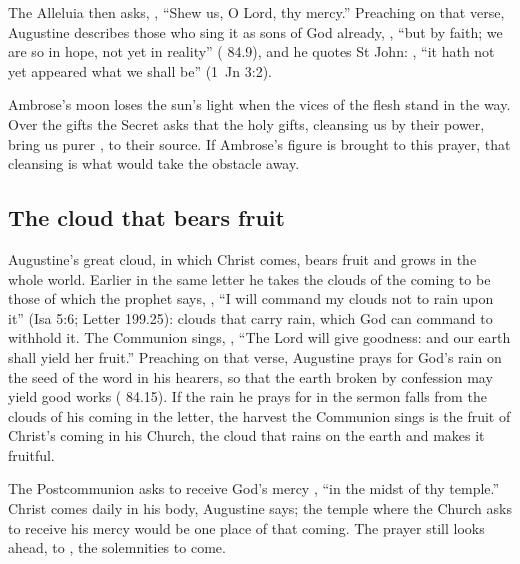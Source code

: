 The Alleluia then asks, ,
``Shew us, O Lord, thy mercy.'' Preaching on that verse, Augustine describes
those who sing it as sons of God already, , ``but by faith; we are so in hope, not yet in
reality'' ( 84.9), and he quotes St John: , ``it hath not yet appeared what we shall be'' (1~Jn
3:2).

Ambrose's moon loses the sun's light when the vices of the flesh stand in the
way. Over the gifts the Secret asks that the holy gifts, cleansing us by their
power, bring us purer , to their source. If
Ambrose's figure is brought to this prayer, that cleansing is what would take
the obstacle away.

\subsection{The cloud that bears fruit}

Augustine's great cloud, in which Christ comes, bears fruit and grows in the
whole world. Earlier in the same letter he takes the clouds of the coming to
be those of which the prophet says, , ``I will command my clouds not to rain upon it'' (Isa 5:6; Letter
199.25): clouds that carry rain, which God can command to withhold it. The
Communion sings, , ``The Lord will give goodness: and our earth shall
yield her fruit.'' Preaching on that verse, Augustine prays for God's rain on
the seed of the word in his hearers, so that the earth broken by confession
may yield good works ( 84.15). If the rain he prays for in
the sermon falls from the clouds of his coming in the letter, the harvest the
Communion sings is the fruit of Christ's coming in his Church, the cloud that
rains on the earth and makes it fruitful.

The Postcommunion asks to receive God's mercy , ``in
the midst of thy temple.'' Christ comes daily in his body, Augustine says;
the temple where the Church asks to receive his mercy would be one place of
that coming. The prayer still looks ahead, to , the
solemnities to come.

